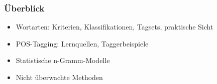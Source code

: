 \begin{frame}
  \frametitle{Überblick}
  \begin{itemize}
  \item Wortarten: Kriterien, Klassifikationen, Tagsets, praktische Sicht
  \item POS-Tagging: Lernquellen, Taggerbeispiele
  \item Statistische n-Gramm-Modelle
  \item Nicht überwachte Methoden
  \end{itemize}
\end{frame}


